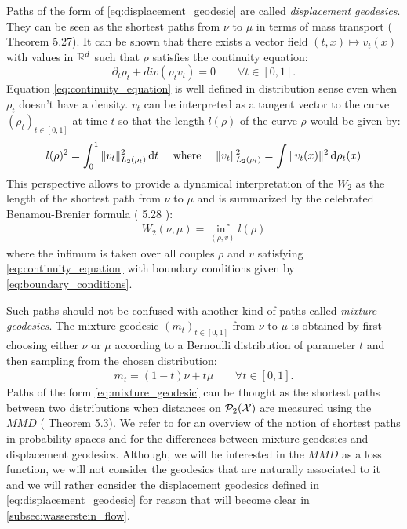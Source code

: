Paths of the form of \cref{eq:displacement_geodesic} are called \textit{displacement geodesics}. They can be seen as the shortest paths from $\nu$ to $\mu$ in terms of mass transport (\cite{Santambrogio:2015} Theorem 5.27). It can be shown that there exists a vector field $(t,x)\mapsto v_t(x)$ with values in ${{\mathbb R}}^d$ such that $\rho$ satisfies the continuity equation:
\begin{equation}\label{eq:continuity_equation}
\partial_t \rho_t + div(\rho_t v_t ) = 0 \qquad \forall t\in[0,1].
\end{equation}
Equation \cref{eq:continuity_equation} is well defined in distribution sense even when $\rho_t$ doesn't have a density. $v_t$ can be interpreted as a tangent vector to the curve $(\rho_t)_{t\in[0,1]}$ at time $t$ so that the length $l(\rho)$ of the curve $\rho$ would be given by:
\begin{equation}
l(\rho)^2 = \int_0^1 \Vert v_t \Vert^2_{L_2(\rho_t)} \mathop{}\!\mathrm{d} t \quad \text{ where } \quad 
\Vert v_t \Vert^2_{L_2(\rho_t)} =  \int \Vert v_t(x) \Vert^2 \mathop{}\!\mathrm{d} \rho_t(x)
\end{equation}
This perspective allows to provide a dynamical interpretation of the $W_2$ as the length  of the shortest path from $\nu$ to $\mu$ and is summarized by the celebrated Benamou-Brenier formula (\cite{Santambrogio:2015} 5.28 ):
\begin{align}\label{eq:benamou-brenier-formula}
W_2(\nu,\mu) = \inf_{(\rho,v)} l(\rho)
\end{align}
where the infimum is taken  over all couples  $\rho$ and $v$ satisfying  \cref{eq:continuity_equation}  with boundary conditions given by \cref{eq:boundary_conditions}.

\begin{remark}
	Such paths should not be confused with another kind of paths called \textit{mixture geodesics}. The mixture geodesic $(m_t)_{t\in[0,1]}$ from $\nu$ to $\mu$ is obtained by first choosing either $\nu$ or $\mu$ according to a Bernoulli distribution of parameter $t$ and then sampling from the chosen distribution:
	\begin{align}\label{eq:mixture_geodesic}
	m_t = (1-t)\nu + t\mu \qquad \forall t \in [0,1].
	\end{align}
	Paths of the form \cref{eq:mixture_geodesic} can be thought as the shortest paths between two distributions when distances on $\mathcal{P}_2({{\mathcal X}})$ are measured using the $MMD$ (\cite{Bottou:2017} Theorem 5.3). We refer to \cite{Bottou:2017} for an overview of the notion of shortest paths in probability spaces and for the differences between mixture geodesics and displacement geodesics.
	Although, we will be interested in the $MMD$ as a loss function, we will not consider the geodesics that are naturally associated to it and we will rather consider the displacement geodesics defined in \cref{eq:displacement_geodesic} for reason that will become clear in \cref{subsec:wasserstein_flow}.
\end{remark}


